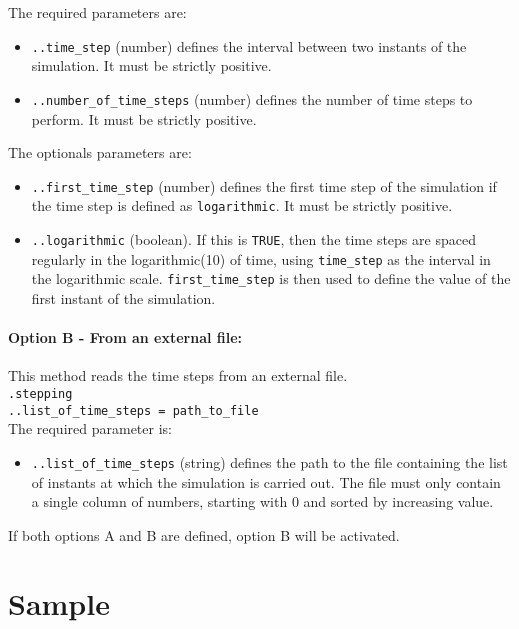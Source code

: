 \documentclass[10pt]{article}
\begin{document}
The required parameters are:

\begin{itemize}[label=]
	\item \verb+..time_step+ (number) defines the interval between two instants of the simulation.
It must be strictly positive.
	\item \verb+..number_of_time_steps+ (number) defines the number of time steps to perform.
It must be strictly positive.
\end{itemize}

The optionals parameters are:

\begin{itemize}[label=]
	\item \verb+..first_time_step+ (number) defines the first time step of the simulation if the time step is defined as \verb+logarithmic+.
It must be strictly positive.
	\item \verb+..logarithmic+ (boolean).
If this is \verb+TRUE+, then the time steps are spaced regularly in the logarithmic(10) of time, using \verb+time_step+ as the interval in the logarithmic scale.
\verb+first_time_step+ is then used to define the value of the first instant of the simulation.
\end{itemize}

\paragraph{Option B - From an external file:} This method reads the time steps from an external file.\\

\noindent \verb+.stepping+\\
\verb+..list_of_time_steps = path_to_file+\\

The required parameter is:

\begin{itemize}[label=]
	\item \verb+..list_of_time_steps+ (string) defines the path to the file containing the list of instants at which the simulation is carried out.
The file must only contain a single column of numbers, starting with 0 and sorted by increasing value.
\end{itemize}

If both options A and B are defined, option B will be activated.

\eject

\section{Sample}
\end{document}
